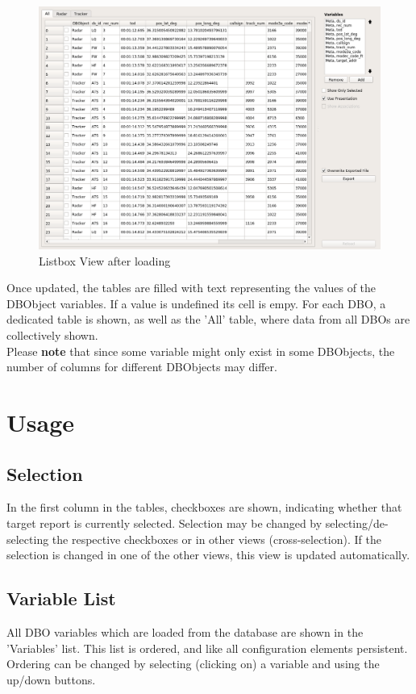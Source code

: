 \begin{figure}[H]
    \hspace*{-2cm}
    \includegraphics[width=18cm,frame]{../screenshots/listbox_loaded.png}
  \caption{Listbox View after loading}
\end{figure}

Once updated, the tables are filled with text representing the values of the DBObject variables.  If a value is undefined its cell is empy. For each DBO, a dedicated table is shown, as well as the 'All' table, where data from all DBOs are collectively shown. \\

Please \textbf{note} that since some variable might only exist in some DBObjects, the number of columns for different DBObjects may differ. \\

\section{Usage}

\subsection{Selection}
In the first column in the tables, checkboxes are shown, indicating whether that target report is currently selected. Selection may be changed by selecting/de-selecting the respective checkboxes or in other views (cross-selection). If the selection is changed in one of the other views, this view is updated automatically.


\subsection{Variable List}
All DBO variables which are loaded from the database are shown in the 'Variables' list. This list is ordered, and like all configuration elements persistent. Ordering can be changed by selecting (clicking on) a variable and using the up/down buttons. \\

